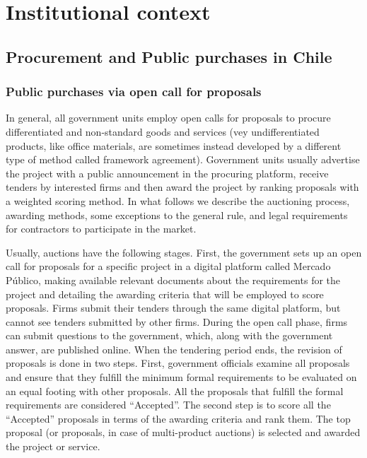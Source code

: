 \chapter{Institutional context}
\section{Procurement and Public purchases in Chile}
\subsection{Public purchases via open call for proposals}
In general, all government units employ open calls for proposals to procure differentiated and non-standard goods and services (vey undifferentiated products, like office materials, are sometimes instead developed by a different type of method called framework agreement).  Government units usually advertise the project with a public announcement in the procuring platform, receive tenders by interested firms and then award the project by ranking proposals with a weighted scoring method. In what follows we describe the auctioning process, awarding methods, some exceptions to the general rule, and legal requirements for contractors to participate in the market.

Usually, auctions have the following stages. First, the government sets up an open call for proposals for a specific project in a digital platform called Mercado Público, making available relevant documents about the requirements for the project and detailing the awarding criteria that will be employed to score proposals. Firms submit their tenders through the same digital platform, but cannot see tenders submitted by other firms. During the open call phase, firms can submit questions to the government, which, along with the government answer, are published online. When the tendering period ends, the revision of proposals is done in two steps. First, government officials examine all proposals and ensure that they fulfill the minimum formal requirements to be evaluated on an equal footing with other proposals. All the proposals that fulfill the formal requirements are considered “Accepted”. The second step is to score all the “Accepted” proposals in terms of the awarding criteria and rank them. The top proposal (or proposals, in case of multi-product auctions) is selected and awarded the project or service.


